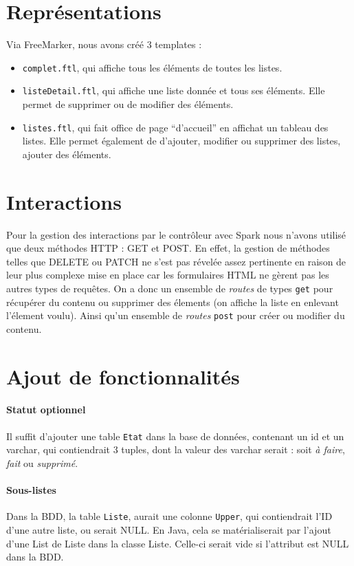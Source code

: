 \documentclass[12pt, a4paper]{article}
\begin{document}
\section{Représentations}

Via FreeMarker, nous avons créé 3 templates :
\begin{itemize}
	\item \verb|complet.ftl|, qui affiche tous les éléments de toutes les listes.
	\item \verb|listeDetail.ftl|, qui affiche une liste donnée et tous ses éléments. Elle permet de supprimer ou de modifier des éléments.
	\item \verb|listes.ftl|, qui fait office de page ``d'accueil'' en affichat un tableau des listes. Elle permet également de d'ajouter, modifier ou supprimer des listes, ajouter des éléments.
\end{itemize}

\section{Interactions}

Pour la gestion des interactions par le contrôleur avec Spark nous n'avons utilisé que deux méthodes HTTP : GET et POST. En effet, la gestion de méthodes telles que DELETE ou PATCH ne s'est pas révelée assez pertinente en raison de leur plus complexe mise en place car les formulaires HTML ne gèrent pas les autres types de requêtes. On a donc un ensemble de \emph{routes} de types \verb|get| pour récupérer du contenu ou supprimer des élements (on affiche la liste en enlevant l'élement voulu). Ainsi qu'un ensemble de \emph{routes} \verb|post| pour créer ou modifier du contenu.

\section{Ajout de fonctionnalités}

\paragraph{Statut optionnel} Il suffit d'ajouter une table \verb|Etat| dans la base de données, contenant un id et un varchar, qui contiendrait 3 tuples, dont la valeur des varchar serait : soit \emph{à faire}, \emph{fait} ou \emph{supprimé}.

\paragraph{Sous-listes}
Dans la BDD, la table \verb|Liste|, aurait une colonne \verb|Upper|, qui contiendrait l'ID d'une autre liste, ou serait NULL.
En Java, cela se matérialiserait par l'ajout d'une List de Liste dans la classe Liste. Celle-ci serait vide si l'attribut est NULL dans la BDD.
\end{document}

